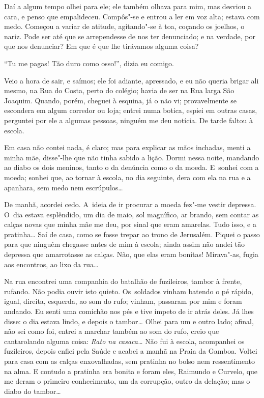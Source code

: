 \begin{linenumbers}
Daí a algum tempo olhei para ele; ele também olhava para mim, mas
desviou a cara, e penso que empalideceu. Compôs"-se e entrou a ler em voz
alta; estava com medo. Começou a variar de atitude, agitando"-se à toa,
coçando os joelhos, o nariz. Pode ser até que se arrependesse de nos ter
denunciado; e na verdade, por que nos denunciar? Em que é que lhe
tirávamos alguma coisa?

``Tu me pagas! Tão duro como osso!'', dizia eu comigo.

Veio a hora de sair, e saímos; ele foi adiante, apressado, e eu não
queria brigar ali mesmo, na Rua do Costa, perto do colégio; havia de ser
na Rua larga São Joaquim. Quando, porém, cheguei à esquina, já o não vi;
provavelmente se escondera em algum corredor ou loja; entrei numa
botica, espiei em outras casas, perguntei por ele a algumas pessoas,
ninguém me deu notícia. De tarde faltou à escola.

Em casa não contei nada, é claro; mas para explicar as mãos inchadas,
menti a minha mãe, disse"-lhe que não tinha sabido a lição. Dormi nessa
noite, mandando ao diabo os dois meninos, tanto o da denúncia como o da
moeda. E~sonhei com a moeda; sonhei que, ao tornar à escola, no dia
seguinte, dera com ela na rua e a apanhara, sem medo nem escrúpulos\ldots{}

De manhã, acordei cedo. A~ideia de ir procurar a moeda fez"-me vestir
depressa. O~dia estava esplêndido, um dia de maio, sol magnífico, ar
brando, sem contar as calças novas que minha mãe me deu, por sinal que
eram amarelas. Tudo isso, e a pratinha\ldots{} Saí de casa, como se fosse
trepar ao trono de Jerusalém. Piquei o passo para que ninguém chegasse
antes de mim à escola; ainda assim não andei tão depressa que
amarrotasse as calças. Não, que elas eram bonitas! Mirava"-as, fugia aos
encontros, ao lixo da rua\ldots{}

Na rua encontrei uma companhia do batalhão de fuzileiros, tambor à
frente, rufando. Não podia ouvir isto quieto. Os~soldados vinham batendo
o pé rápido, igual, direita, esquerda, ao som do rufo; vinham, passaram
por mim e foram andando. Eu senti uma comichão nos pés e tive ímpeto de
ir atrás deles. Já lhes disse: o dia estava lindo, e depois o tambor\ldots{}
Olhei para um e outro lado; afinal, não sei como foi, entrei a marchar
também ao som do rufo, creio que cantarolando alguma coisa: \emph{Rato
na casaca\ldots{}} Não fui à escola, acompanhei os fuzileiros, depois enfiei
pela Saúde e acabei a manhã na Praia da Gamboa. Voltei para casa com as
calças enxovalhadas, sem pratinha no bolso nem ressentimento na alma. E
contudo a pratinha era bonita e foram eles, Raimundo e Curvelo, que me
deram o primeiro conhecimento, um da corrupção, outro da delação; mas o
diabo do tambor\ldots{}

\end{linenumbers}

